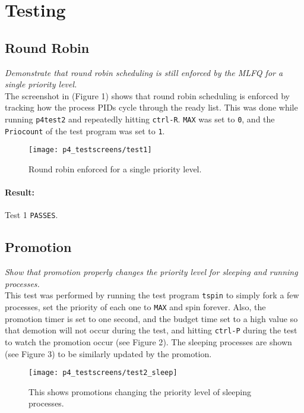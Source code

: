 \documentclass[11pt,letterpaper]{report}
\begin{document}
		 

	
	
	\newpage
	\section{Testing}
	
	\subsection{Round Robin}
	\emph{Demonstrate that round robin scheduling is still enforced by the MLFQ for a single priority level.}\\
	
	The screenshot in ({\color{red}Figure 1}) shows that round robin scheduling is enforced by tracking how the process PIDs cycle through the ready list. This was done while running {\tt p4test2} and repeatedly hitting {\tt ctrl-R}. {\tt MAX} was set to {\tt 0}, and the {\tt Priocount} of the test program was set to {\tt 1}.
	
\begin{figure}
	\centering
	\texttt{[image: p4\_testscreens/test1]}
	\caption{Round robin enforced for a single priority level.}
	\label{fig:test1}
\end{figure}

	\paragraph{Result:}Test 1 {\tt PASSES}.
	
	\subsection{Promotion}
	\emph{Show that promotion properly changes the priority level for sleeping and running processes.}\\
	
	This test was performed by running the test program {\tt tspin} to simply fork a few processes, set the priority of each one to {\tt MAX} and spin forever. Also, the promotion timer is set to one second, and the budget time set to a high value so that demotion will not occur during the test, and hitting {\tt ctrl-P} during the test to watch the promotion occur (see {\color{red}Figure 2}). The sleeping processes are shown (see {\color{red}Figure 3}) to be similarly updated by the promotion.
	
\begin{figure}
	\centering
	\texttt{[image: p4\_testscreens/test2\_sleep]}
	\caption{This shows promotions changing the priority level of sleeping processes.}
	\label{fig:test2sleep}
\end{figure}
	
\end{document}
